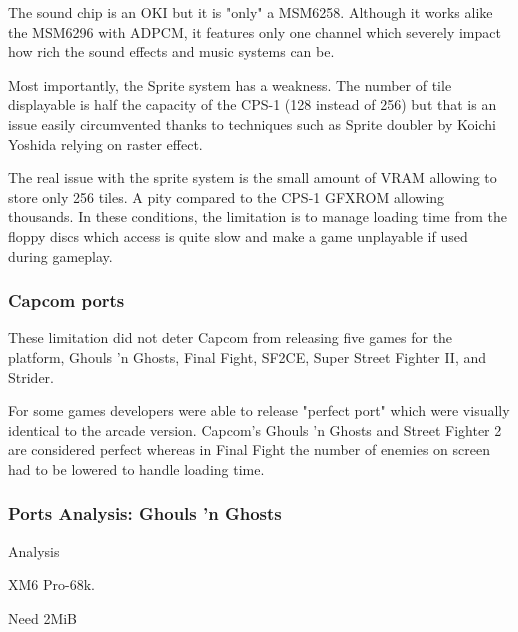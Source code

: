 The sound chip is an OKI but it is "only" a MSM6258. Although it works alike the MSM6296 with ADPCM, it features only one channel which severely impact how rich the sound effects and music systems can be.

Most importantly, the Sprite system has a weakness. The number of tile displayable is half the capacity of the CPS-1 (128 instead of 256) but that is an issue easily circumvented thanks to techniques such as Sprite doubler by Koichi Yoshida\cite{x68000spritedoubler} relying on raster effect.

The real issue with the sprite system is the small amount of VRAM allowing to store only 256 tiles. A pity compared to the CPS-1 GFXROM allowing thousands. In these conditions, the limitation is to manage loading time from the floppy discs which access is quite slow and make a game unplayable if used during gameplay.

\subsubsection{Capcom ports}
These limitation did not deter Capcom from releasing five games for the platform, Ghouls 'n Ghosts, Final Fight, SF2CE, Super Street Fighter II, and Strider. 

 For some games developers were able to release "perfect port" which were visually identical to the arcade version. Capcom's Ghouls 'n Ghosts and Street Fighter 2 are considered perfect whereas in Final Fight the number of enemies on screen had to be lowered to handle loading time.

\subsubsection{Ports Analysis: Ghouls 'n Ghosts}
 Analysis\cite{x68k_games_analysis}

XM6 Pro-68k.

Need 2MiB


\begin{minipage}[t]{0.49\linewidth}
\end{minipage}%
\hfill
\begin{minipage}[t]{0.49\linewidth}
\end{minipage}%

\begin{minipage}[t]{0.49\linewidth}
\end{minipage}%
\hfill
\begin{minipage}[t]{0.49\linewidth}
\end{minipage}%

